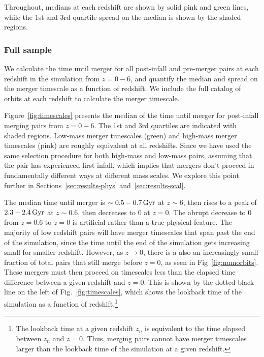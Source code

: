 \documentclass[twocolumn,linenumbers]{aastex631}
\begin{document}
Throughout, medians at each redshift are shown by solid pink and green lines, while the 1st and 3rd quartile spread on the median is shown by the shaded regions. 

\subsubsection{Full sample}
    We calculate the time until merger for all post-infall and pre-merger pairs at each redshift in the simulation from $z=0-6$, and quantify the median and spread on the merger timescale as a function of redshift. 
    We include the full catalog of orbits at each redshift to calculate the merger timescale. 
    
    Figure~\ref{fig:timescales} presents the median of the time until merger for post-infall merging pairs from $z=0-6$. 
    The 1st and 3rd quartiles are indicated with shaded regions. 
    Low-mass merger timescales (green) and high-mass merger timescales (pink) are roughly equivalent at all redshifts. 
    Since we have used the same selection procedure for both high-mass and low-mass pairs, assuming that the pair has experienced first infall, which implies that mergers don't proceed in fundamentally different ways at different mass scales. 
    We explore this point further in Sections~\ref{sec:results-phys} and~\ref{sec:results-scal}.
    
    The median time until merger is $\sim0.5-0.7\,\mathrm{Gyr}$ at $z\sim6$, then rises to a peak of $2.3-2.4\,\mathrm{Gyr}$ at $z\sim0.6$, then decreases to 0 at $z=0$.
    The abrupt decrease to 0 from $z=0.6$ to $z=0$ is artificial rather than a true physical feature.
    The majority of low redshift pairs will have merger timescales that span past the end of the simulation, since the time until the end of the simulation gets increasing small for smaller redshift. 
    However, as $z\to0$, there is a also an increasingly small fraction of total pairs that still merge before $z=0$, as seen in Fig~\ref{fig:numorbits}. 
    These mergers must then proceed on timescales less than the elapsed time difference between a given redshift and $z=0$. 
    This is shown by the dotted black line on the left of Fig.~\ref{fig:timescales}, which shows the lookback time of the simulation as a function of redshift.\footnote{The lookback time at a given redshift $z_n$ is equivalent to the time elapsed between $z_n$ and $z=0$. Thus, merging pairs cannot have merger timescales larger than the lookback time of the simulation at a given redshift.} %
    
\end{document}
